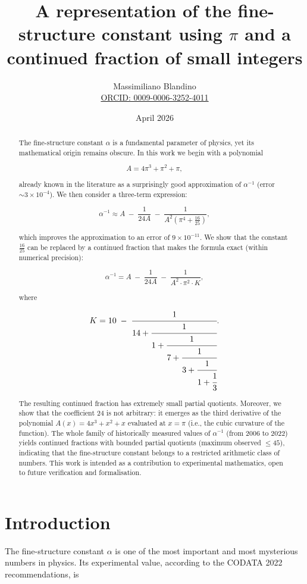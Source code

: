 \documentclass[12pt]{article}
\title{A representation of the fine-structure constant using $\pi$ and a continued fraction of small integers}
\author{Massimiliano Blandino \\ 
\href{https://orcid.org/0009-0006-3252-4011}{ORCID: 0009-0006-3252-4011}}
\date{April 2026}
\begin{document}
\maketitle

\begin{abstract}
The fine-structure constant $\alpha$ is a fundamental parameter of physics, yet its mathematical origin remains obscure. In this work we begin with a polynomial

\[
A = 4\pi^3 + \pi^2 + \pi,
\]

already known in the literature as a surprisingly good approximation of $\alpha^{-1}$ (error $\sim 3\times10^{-4}$). We then consider a three-term expression:

\[
\alpha^{-1} \approx A \;-\; \frac{1}{24A} \;-\; \frac{1}{A^2\left(\pi^4 + \frac{16}{25}\right)},
\]

which improves the approximation to an error of $9\times10^{-11}$. We show that the constant $\frac{16}{25}$ can be replaced by a continued fraction that makes the formula exact (within numerical precision):

\[
\alpha^{-1} = A \;-\; \frac{1}{24A} \;-\; \frac{1}{A^2 \cdot \pi^2 \cdot K},
\]

where

\[
K = 10 \;-\; \cfrac{1}{14 + \cfrac{1}{1 + \cfrac{1}{7 + \cfrac{1}{3 + \cfrac{1}{1 + \cfrac{1}{3}}}}}}.
\]

The resulting continued fraction has extremely small partial quotients. Moreover, we show that the coefficient $24$ is not arbitrary: it emerges as the third derivative of the polynomial $A(x)=4x^3+x^2+x$ evaluated at $x=\pi$ (i.e., the cubic curvature of the function). The whole family of historically measured values of $\alpha^{-1}$ (from 2006 to 2022) yields continued fractions with bounded partial quotients (maximum observed $\le 45$), indicating that the fine-structure constant belongs to a restricted arithmetic class of numbers. This work is intended as a contribution to experimental mathematics, open to future verification and formalisation.
\end{abstract}

\section{Introduction}

The fine-structure constant $\alpha$ is one of the most important and most mysterious numbers in physics. Its experimental value, according to the CODATA 2022 recommendations, is
\end{document}
